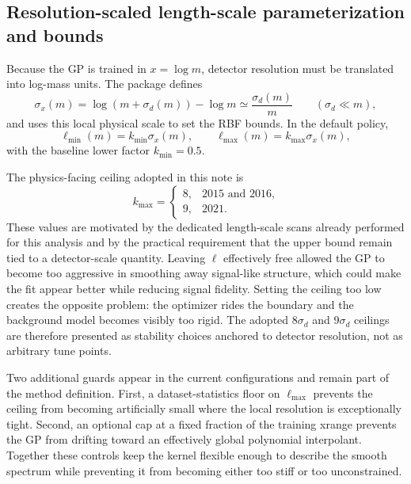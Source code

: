 \subsection{Resolution-scaled length-scale parameterization and bounds}
\label{sec:length-scale}

Because the GP is trained in $x=\log m$, detector resolution must be translated into
log-mass units. The package defines
\begin{equation}
\sigma_x(m) = \log\!\left(m+\sigma_d(m)\right) - \log m
\simeq \frac{\sigma_d(m)}{m}
\qquad (\sigma_d \ll m),
\end{equation}
and uses this local physical scale to set the RBF bounds. In the default
 policy,
\begin{equation}
\ell_{\min}(m) = k_{\min}\sigma_x(m),
\qquad
\ell_{\max}(m) = k_{\max}\sigma_x(m),
\end{equation}
with the baseline lower factor $k_{\min}=0.5$.

The physics-facing ceiling adopted in this note is
\begin{equation}
k_{\max} =
\begin{cases}
8, & \text{2015 and 2016}, \\
9, & \text{2021}.
\end{cases}
\end{equation}
These values are motivated by the dedicated length-scale scans already performed for
this analysis and by the practical requirement that the upper bound remain tied to a
detector-scale quantity. Leaving $\ell$ effectively free allowed the GP to become too
aggressive in smoothing away signal-like structure, which could make the fit appear
better while reducing signal fidelity. Setting the ceiling too low creates the opposite
problem: the optimizer rides the boundary and the background model becomes visibly too
rigid. The adopted 8$\sigma_d$ and 9$\sigma_d$ ceilings are therefore presented as
stability choices anchored to detector resolution, not as arbitrary tune points.

Two additional guards appear in the current configurations and remain part of the
method definition. First, a dataset-statistics floor on $\ell_{\max}$ prevents the
ceiling from becoming artificially small where the local resolution is exceptionally
tight. Second, an optional cap at a fixed fraction of the training xrange prevents the
GP from drifting toward an effectively global polynomial interpolant. Together these
controls keep the kernel flexible enough to describe the smooth spectrum while
preventing it from becoming either too stiff or too unconstrained.

